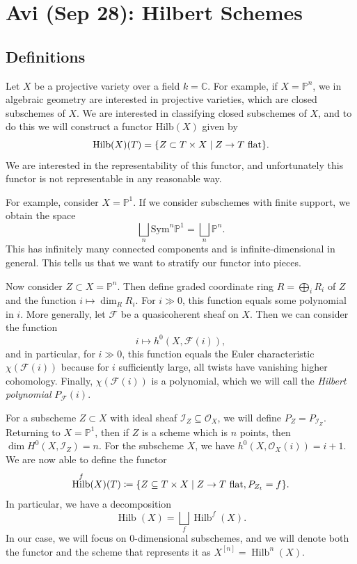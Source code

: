 \documentclass[leqno, openany]{memoir}
\theoremstyle{definition}
\theoremstyle{remark}
\theoremstyle{plain}
\theoremstyle{definition}
\theoremstyle{remark}
\newcommand{\C}{\mathbb{C}}
\renewcommand{\P}{\mathbb{P}}
\newcommand{\mc}[1]{\mathcal{#1}}
\newcommand{\mr}[1]{\mathrm{#1}}
\DeclareMathOperator{\Hilb}{Hilb}
\begin{document}
\chapter{Avi (Sep 28): Hilbert Schemes}%
\label{cha:avi_sep_28_hilbert_schemes}

\section{Definitions}%
\label{sec:definitions}

Let $X$ be a projective variety over a field $k = \C$. For example, if $X = \P^n$, we in algebraic geometry are interested in projective varieties, which are closed subschemes of $X$. We are interested in classifying closed subschemes of $X$, and to do this we will construct a functor $\mr{Hilb}(X)$ given by
\[ \Hilb(X)(T) = \qty{ Z \subset T \times X \mid Z \to T \text{ flat}}. \]
We are interested in the representability of this functor, and unfortunately this functor is not representable in any reasonable way.

For example, consider $X = \P^1$. If we consider subschemes with finite support, we obtain the space
\[ \bigsqcup_n \mr{Sym}^n \P^1 = \bigsqcup_n \P^n. \]
This has infinitely many connected components and is infinite-dimensional in general. This tells us that we want to stratify our functor into pieces.

Now consider $Z \subset X = \P^n$. Then define graded coordinate ring $R = \bigoplus_i R_i$ of $Z$ and the function $i \mapsto \dim_R R_i$. For $i \gg 0$, this function equals some polynomial in $i$. More generally, let $\mc{F}$ be a quasicoherent sheaf on $X$. Then we can consider the function
\[ i \mapsto h^0(X, \mc{F}(i)), \]
and in particular, for $i \gg 0$, this function equals the Euler characteristic $\chi(\mc{F}(i))$ because for $i$ sufficiently large, all twists have vanishing higher cohomology. Finally, $\chi(\mc{F}(i))$ is a polynomial, which we will call the \textit{Hilbert polynomial} $P_{\mc{F}}(i)$.

For a subscheme $Z \subset X$ with ideal sheaf $\mc{I}_Z \subseteq \mc{O}_X$, we will define $P_Z = P_{\mc{I}_Z}$. Returning to $X = \P^1$, then if $Z$ is a scheme which is $n$ points, then $\dim H^0(X, \mc{I}_Z) = n$. For the subscheme $X$, we have $h^0(X, \mc{O}_X(i)) = i+1$. We are now able to define the functor
\[ \Hilb^f(X)(T) \coloneqq \qty{Z \subseteq T \times X \mid Z \to T \text{ flat}, P_{Z_t} = f}. \]
In particular, we have a decomposition
\[ \Hilb(X) = \bigsqcup_f \Hilb^f(X). \]
In our case, we will focus on $0$-dimensional subschemes, and we will denote both the functor and the scheme that represents it as $X^{[n]} = \Hilb^n(X)$.
\end{document}
